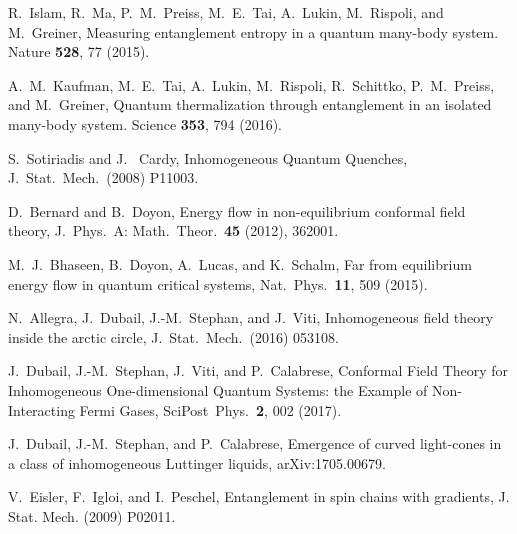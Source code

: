 \documentclass[twocolumn,superscriptaddress,prb,10pt]{revtex4-1}
\begin{document}







\begin{thebibliography}{99}
R.~Islam, R.~Ma, P.~M.~Preiss, M.~E.~Tai, A.~Lukin, M.~Rispoli, and M.~Greiner,  
Measuring entanglement entropy in a quantum many-body system. Nature {\bf 528}, 77 (2015). 

A.~M.~Kaufman, M.~E.~Tai, A.~Lukin, M.~Rispoli, R.~Schittko, P.~M.~Preiss, and  M.~Greiner, 
Quantum thermalization through entanglement in an isolated many-body system. Science {\bf 353}, 794 (2016). 

S.~Sotiriadis and J. ~Cardy, Inhomogeneous Quantum Quenches, 
J.\ Stat.\ Mech.\ (2008) P11003. 

D.~Bernard and B.~Doyon, Energy flow in non-equilibrium conformal field theory, 
J.\ Phys.\ A: Math.\ Theor.\ {\bf 45} (2012), 362001.  

M.~J.~Bhaseen, B.~Doyon, A.~Lucas, and K.~Schalm, 
Far from equilibrium energy flow in quantum critical systems, 
Nat.\ Phys.\ {\bf 11}, 509 (2015).

N.~Allegra, J.~Dubail, J.-M.~Stephan, and J.~Viti, 
Inhomogeneous field theory inside the arctic circle, 
J.\ Stat.\ Mech.\ (2016) 053108.

J.~Dubail, J.-M.~Stephan, J.~Viti, and P.~Calabrese, 
Conformal Field Theory for Inhomogeneous One-dimensional 
Quantum Systems: the Example of Non-Interacting Fermi Gases, 
SciPost\ Phys.\ {\bf 2}, 002 (2017). 

J.~Dubail, J.-M.~Stephan, and P.~Calabrese,
Emergence of curved light-cones in a class of inhomogeneous Luttinger liquids, 
arXiv:1705.00679. 

	V.~Eisler, F.~Igloi, and I.~Peschel, 
	Entanglement in spin chains with gradients, 
	J. Stat. Mech. (2009) P02011. 



\end{thebibliography}
\end{document}
